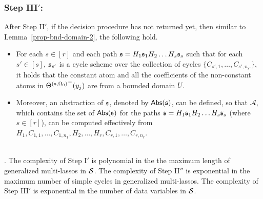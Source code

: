 \subsubsection{Step III$'$:}
After Step II$'$, if the decision procedure has not returned yet, then similar to Lemma~\ref{prop-bnd-domain-2}, the following hold.
\begin{itemize}
\item For each $s \in [r]$ and each path ${\mathfrak{s} }=H_1 {\mathfrak{s} }_1 H_2 \dots H_s {\mathfrak{s} }_s$ such that for each $s'\in [s]$, ${\mathfrak{s} }_{s'}$ is a cycle scheme over the collection of cycles $\{C_{s',1},\dots,C_{s',n_{s'}}\}$, it holds that the constant atom and all the coefficients of the non-constant atoms in ${\Theta^{({\mathfrak{s} },\Omega_0)}}^-(y_j)$ are from a bounded domain $U$.
%
\item Moreover,  an abstraction of ${\mathfrak{s} }$, denoted by $\mathsf{Abs}({\mathfrak{s} })$, can be defined, so that $\mathscr{A}$, which contains the set of $\mathsf{Abs}({\mathfrak{s} })$ for the paths ${\mathfrak{s} }=H_1 {\mathfrak{s} }_1 H_2 \dots H_s {\mathfrak{s} }_s$ (where $s \in [r]$), can be computed effectively from 
$H_1, C_{1,1}, \dots, C_{1,n_1},H_2,\dots, H_r,C_{r,1},\dots, C_{r,n_r}$.
\end{itemize}
\medskip
{}\bigskip\\

. The complexity of Step I$'$ is polynomial in the the maximum length of generalized multi-lassos in ${\mathcal{S} }$. The complexity of Step II$''$ is exponential in the maximum number of simple cycles in generalized multi-lassos. The complexity of Step III$'$ is exponential in the number of data variables in ${\mathcal{S} }$.

